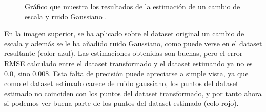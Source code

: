 \begin{figure}[H]
\begin{center}
\hspace{0.5cm}

\end{center}

\caption{Gráfico que muestra los resultados de la estimación de un cambio de escala y ruido Gaussiano .}
\end{figure}

En la imagen superior, se ha aplicado sobre el dataset original un cambio de escala y además se le ha añadido ruido Gaussiano, como puede verse en el dataset resultante (color azul). Las estimaciones obtenidas son buenas, pero el error RMSE calculado entre el dataset transformado y el dataset estimando ya no es 0.0, sino 0.008. Esta falta de precisión puede apreciarse a simple vista, ya que como el dataset estimado carece de ruido gaussiano, los puntos del dataset estimado no coinciden con los puntos del dataset transformado, y por tanto ahora si podemos ver buena parte de los puntos del dataset estimado (colo rojo).

